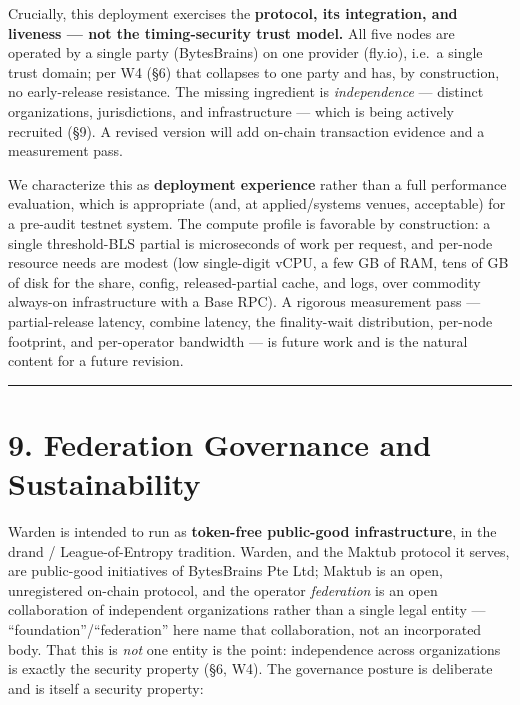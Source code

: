 \documentclass[
  11pt,
]{article}
\begin{document}
Crucially, this deployment exercises the \textbf{protocol, its
integration, and liveness --- not the timing-security trust model.} All
five nodes are operated by a single party (BytesBrains) on one provider
(fly.io), i.e.~a single trust domain; per W4 (§6) that collapses to one
party and has, by construction, no early-release resistance. The missing
ingredient is \emph{independence} --- distinct organizations,
jurisdictions, and infrastructure --- which is being actively recruited
(§9). A revised version will add on-chain transaction evidence and a
measurement pass.

We characterize this as \textbf{deployment experience} rather than a
full performance evaluation, which is appropriate (and, at
applied/systems venues, acceptable) for a pre-audit testnet system. The
compute profile is favorable by construction: a single threshold-BLS
partial is microseconds of work per request, and per-node resource needs
are modest (low single-digit vCPU, a few GB of RAM, tens of GB of disk
for the share, config, released-partial cache, and logs, over commodity
always-on infrastructure with a Base RPC). A rigorous measurement pass
--- partial-release latency, combine latency, the finality-wait
distribution, per-node footprint, and per-operator bandwidth --- is
future work and is the natural content for a future revision.

\begin{center}\rule{0.5\linewidth}{0.5pt}\end{center}

\section{9. Federation Governance and
Sustainability}\label{federation-governance-and-sustainability}

Warden is intended to run as \textbf{token-free public-good
infrastructure}, in the drand / League-of-Entropy tradition. Warden, and
the Maktub protocol it serves, are public-good initiatives of
BytesBrains Pte Ltd; Maktub is an open, unregistered on-chain protocol,
and the operator \emph{federation} is an open collaboration of
independent organizations rather than a single legal entity ---
``foundation''/``federation'' here name that collaboration, not an
incorporated body. That this is \emph{not} one entity is the point:
independence across organizations is exactly the security property (§6,
W4). The governance posture is deliberate and is itself a security
property:
\end{document}
